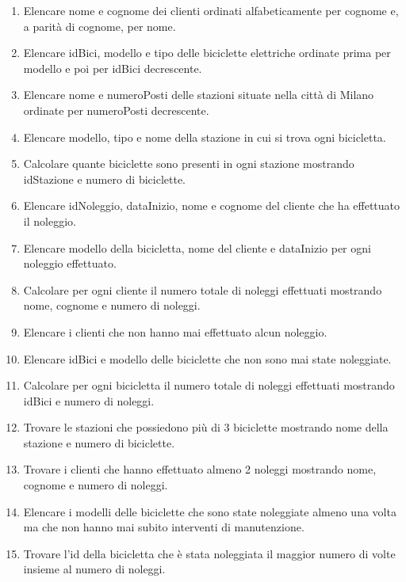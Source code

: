 \documentclass[a4paper,12pt]{article}
\begin{document}
\begin{enumerate}

\item Elencare nome e cognome dei clienti ordinati alfabeticamente per cognome e, a parità di cognome, per nome.

\item Elencare idBici, modello e tipo delle biciclette elettriche ordinate prima per modello e poi per idBici decrescente.

\item Elencare nome e numeroPosti delle stazioni situate nella città di Milano ordinate per numeroPosti decrescente.

\item Elencare modello, tipo e nome della stazione in cui si trova ogni bicicletta.

\item Calcolare quante biciclette sono presenti in ogni stazione mostrando idStazione e numero di biciclette.

\item Elencare idNoleggio, dataInizio, nome e cognome del cliente che ha effettuato il noleggio.

\item Elencare modello della bicicletta, nome del cliente e dataInizio per ogni noleggio effettuato.

\item Calcolare per ogni cliente il numero totale di noleggi effettuati mostrando nome, cognome e numero di noleggi.

\item Elencare i clienti che non hanno mai effettuato alcun noleggio.

\item Elencare idBici e modello delle biciclette che non sono mai state noleggiate.

\item Calcolare per ogni bicicletta il numero totale di noleggi effettuati mostrando idBici e numero di noleggi.

\item Trovare le stazioni che possiedono più di 3 biciclette mostrando nome della stazione e numero di biciclette.

\item Trovare i clienti che hanno effettuato almeno 2 noleggi mostrando nome, cognome e numero di noleggi.

\item Elencare i modelli delle biciclette che sono state noleggiate almeno una volta ma che non hanno mai subito interventi di manutenzione.

\item Trovare l'id della bicicletta che è stata noleggiata il maggior numero di volte insieme al numero di noleggi.
\end{enumerate}
\end{document}

